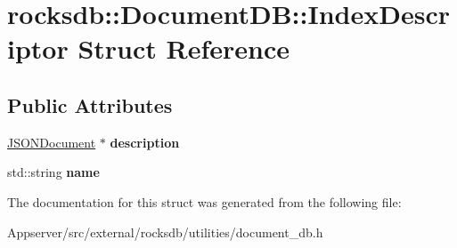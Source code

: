 \hypertarget{structrocksdb_1_1DocumentDB_1_1IndexDescriptor}{}\section{rocksdb\+:\+:Document\+DB\+:\+:Index\+Descriptor Struct Reference}
\label{structrocksdb_1_1DocumentDB_1_1IndexDescriptor}
\subsection*{Public Attributes}
\begin{DoxyCompactItemize}
\item 
\hyperlink{classrocksdb_1_1JSONDocument}{J\+S\+O\+N\+Document} $\ast$ {\bfseries description}\hypertarget{structrocksdb_1_1DocumentDB_1_1IndexDescriptor_a751c9998862c1eb4415d0e85a623b3ee}{}\label{structrocksdb_1_1DocumentDB_1_1IndexDescriptor_a751c9998862c1eb4415d0e85a623b3ee}

\item 
std\+::string {\bfseries name}\hypertarget{structrocksdb_1_1DocumentDB_1_1IndexDescriptor_a681c33f5d7f89fa231aeb9cbf629a566}{}\label{structrocksdb_1_1DocumentDB_1_1IndexDescriptor_a681c33f5d7f89fa231aeb9cbf629a566}

\end{DoxyCompactItemize}


The documentation for this struct was generated from the following file\+:\begin{DoxyCompactItemize}
\item 
Appserver/src/external/rocksdb/utilities/document\+\_\+db.\+h\end{DoxyCompactItemize}
